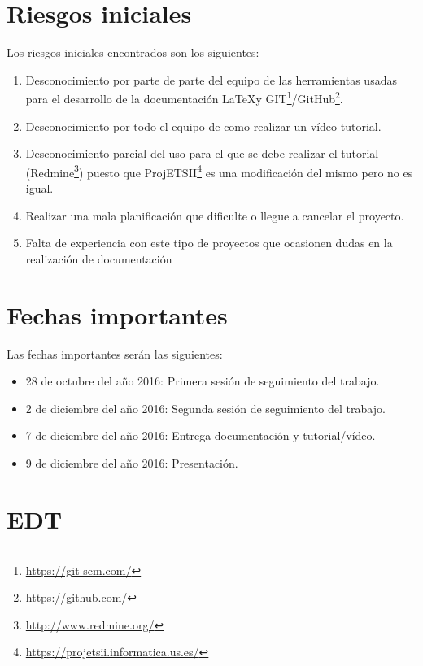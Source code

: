 \documentclass[a4paper,10pt]{scrartcl}
\begin{document}
\section{Riesgos iniciales}

Los riesgos iniciales encontrados son los siguientes:
\begin{enumerate}
	\item Desconocimiento por parte de parte del equipo de las herramientas usadas para el desarrollo de la documentación \LaTeX y GIT\footnote{\url{https://git-scm.com/}}/GitHub\footnote{\url{https://github.com/}}.
	
	\item Desconocimiento por todo el equipo de como realizar un vídeo tutorial.
	
	\item Desconocimiento parcial del uso para el que se debe realizar el tutorial (Redmine\footnote{\url{http://www.redmine.org/}}) puesto que ProjETSII\footnote{\url{https://projetsii.informatica.us.es/}} es una modificación del mismo pero no es igual.
	
	\item Realizar una mala planificación que dificulte o llegue a cancelar el proyecto.
	
	\item Falta de experiencia con este tipo de proyectos que ocasionen dudas en la realización de documentación 
\end{enumerate}


\section{Fechas importantes}
Las fechas importantes serán las siguientes:

	\begin{itemize}
		\item 28 de octubre del año 2016: Primera sesión de seguimiento del trabajo.
		
		\item 2 de diciembre del año 2016: Segunda sesión de seguimiento del trabajo.
		
		\item 7 de diciembre del año 2016: Entrega documentación y tutorial/vídeo.
		
		\item 9 de diciembre del año 2016: Presentación.
	\end{itemize}

\section{EDT}
\end{document}
